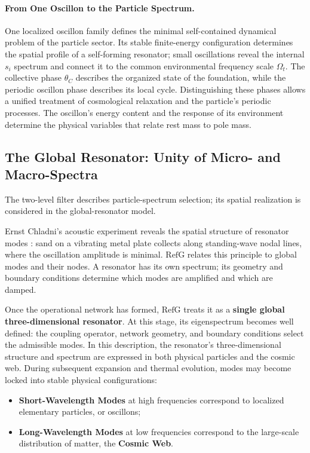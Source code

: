 \documentclass[11pt,a4paper]{article}
\newcommand{\RefG}{\mathrm{RefG}}
\begin{document}
\paragraph{From One Oscillon to the Particle Spectrum.}

One localized oscillon family defines the minimal self-contained dynamical problem of the particle sector. Its stable finite-energy configuration determines the spatial profile of a self-forming resonator; small oscillations reveal the internal $s_i$ spectrum and connect it to the common environmental frequency scale $\Omega_t$. The collective phase $\theta_C$ describes the organized state of the foundation, while the periodic oscillon phase describes its local cycle. Distinguishing these phases allows a unified treatment of cosmological relaxation and the particle's periodic processes. The oscillon's energy content and the response of its environment determine the physical variables that relate rest mass to pole mass.

\subsection{The Global Resonator: Unity of Micro- and Macro-Spectra}

The two-level filter describes particle-spectrum selection; its spatial realization is considered in the global-resonator model.

Ernst Chladni's acoustic experiment reveals the spatial structure of resonator modes \citep{chladni1787}: sand on a vibrating metal plate collects along standing-wave nodal lines, where the oscillation amplitude is minimal. $\RefG$ relates this principle to global modes and their nodes. A resonator has its own spectrum; its geometry and boundary conditions determine which modes are amplified and which are damped.

Once the operational network has formed, $\RefG$ treats it as a \textbf{single global three-dimensional resonator}. At this stage, its eigenspectrum becomes well defined: the coupling operator, network geometry, and boundary conditions select the admissible modes. In this description, the resonator's three-dimensional structure and spectrum are expressed in both physical particles and the cosmic web. During subsequent expansion and thermal evolution, modes may become locked into stable physical configurations:
\begin{itemize}
\item \textbf{Short-Wavelength Modes} at high frequencies correspond to localized elementary particles, or oscillons;
\item \textbf{Long-Wavelength Modes} at low frequencies correspond to the large-scale distribution of matter, the \textbf{Cosmic Web}.
\end{itemize}
\end{document}
